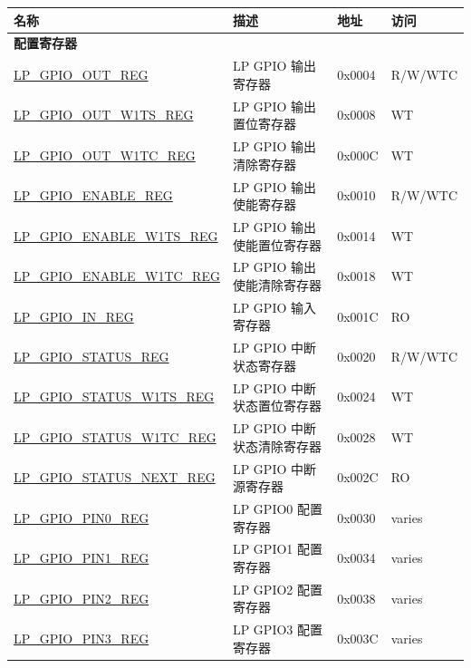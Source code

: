 \begin{longtable}{ | p{6cm} | p{7.2cm} | p{1.3cm} | p{1cm} | }
\hline\rowcolor{lightgray}
\textbf{名称} & \textbf{描述} &  \textbf{地址} & \textbf{访问} \\ \hline
\endhead
\multicolumn{4}{|l|}{\textbf{配置寄存器}} \\ \hline
\hyperref[regdesc:LPGPIOOUTREG]{LP\_GPIO\_OUT\_REG} & LP GPIO 输出寄存器 & 0x0004 & R/W/WTC \\ \hline
\hyperref[regdesc:LPGPIOOUTW1TSREG]{LP\_GPIO\_OUT\_W1TS\_REG} & LP GPIO 输出置位寄存器 & 0x0008 & WT \\ \hline
\hyperref[regdesc:LPGPIOOUTW1TCREG]{LP\_GPIO\_OUT\_W1TC\_REG} & LP GPIO 输出清除寄存器 & 0x000C & WT \\ \hline
\hyperref[regdesc:LPGPIOENABLEREG]{LP\_GPIO\_ENABLE\_REG} & LP GPIO 输出使能寄存器 & 0x0010 & R/W/WTC \\ \hline
\hyperref[regdesc:LPGPIOENABLEW1TSREG]{LP\_GPIO\_ENABLE\_W1TS\_REG} & LP GPIO 输出使能置位寄存器 & 0x0014 & WT \\ \hline
\hyperref[regdesc:LPGPIOENABLEW1TCREG]{LP\_GPIO\_ENABLE\_W1TC\_REG} & LP GPIO 输出使能清除寄存器 & 0x0018 & WT \\ \hline
\hyperref[regdesc:LPGPIOINREG]{LP\_GPIO\_IN\_REG} & LP GPIO 输入寄存器 & 0x001C & RO \\ \hline
\hyperref[regdesc:LPGPIOSTATUSREG]{LP\_GPIO\_STATUS\_REG} & LP GPIO 中断状态寄存器 & 0x0020 & R/W/WTC \\ \hline
\hyperref[regdesc:LPGPIOSTATUSW1TSREG]{LP\_GPIO\_STATUS\_W1TS\_REG} & LP GPIO 中断状态置位寄存器 & 0x0024 & WT \\ \hline
\hyperref[regdesc:LPGPIOSTATUSW1TCREG]{LP\_GPIO\_STATUS\_W1TC\_REG} & LP GPIO 中断状态清除寄存器 & 0x0028 & WT \\ \hline
\hyperref[regdesc:LPGPIOSTATUSNEXTREG]{LP\_GPIO\_STATUS\_NEXT\_REG} & LP GPIO 中断源寄存器 & 0x002C & RO \\ \hline
\hyperref[regdesc:LPGPIOPINNREG]{LP\_GPIO\_PIN0\_REG} & LP GPIO0 配置寄存器 & 0x0030 & varies \\ \hline
\hyperref[regdesc:LPGPIOPINNREG]{LP\_GPIO\_PIN1\_REG} & LP GPIO1 配置寄存器 & 0x0034 & varies \\ \hline
\hyperref[regdesc:LPGPIOPINNREG]{LP\_GPIO\_PIN2\_REG} & LP GPIO2 配置寄存器 & 0x0038 & varies \\ \hline
\hyperref[regdesc:LPGPIOPINNREG]{LP\_GPIO\_PIN3\_REG} & LP GPIO3 配置寄存器 & 0x003C & varies \\ \hline

\end{longtable}
